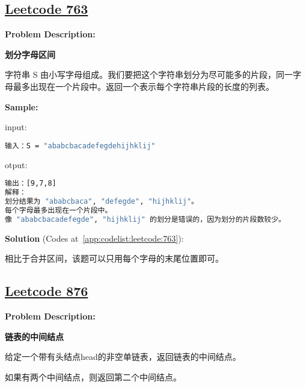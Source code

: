 \subsection{\href{https://leetcode-cn.com/}{Leetcode 763}}\label{app:problemlist:leetcode:763}

\textbf{Problem Description:}\par

\textbf{划分字母区间}\par

字符串 S 由小写字母组成。我们要把这个字符串划分为尽可能多的片段，同一字母最多出现在一个片段中。返回一个表示每个字符串片段的长度的列表。\par


\textbf{Sample:}\par

input:\par

\begin{lstlisting}[language=bash]
输入：S = "ababcbacadefegdehijhklij"
\end{lstlisting}

otput:\par

\begin{lstlisting}[language=bash]
输出：[9,7,8]
解释：
划分结果为 "ababcbaca", "defegde", "hijhklij"。
每个字母最多出现在一个片段中。
像 "ababcbacadefegde", "hijhklij" 的划分是错误的，因为划分的片段数较少。
\end{lstlisting}

\textbf{Solution }(Codes at~\ref{app:codelist:leetcode:763}):\par

相比于合并区间，该题可以只用每个字母的末尾位置即可。\par



\subsection{\href{https://leetcode-cn.com/}{Leetcode 876}}\label{app:problemlist:leetcode:876}

\textbf{Problem Description:}\par

\textbf{链表的中间结点}\par

给定一个带有头结点head的非空单链表，返回链表的中间结点。\par

如果有两个中间结点，则返回第二个中间结点。\par


